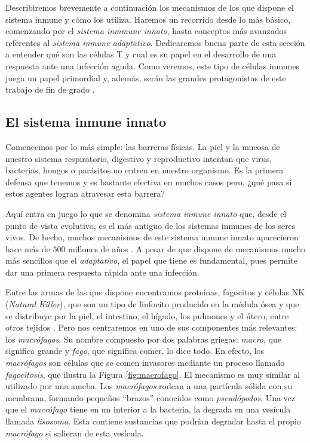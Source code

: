Describiremos brevemente a continuación los mecanismos de los que dispone el sistema inmune y cómo los utiliza. Haremos un recorrido desde lo más básico, comenzando por el \textit{sistema inmmune innato}, hasta conceptos más avanzados referentes al \textit{sistema inmune adaptativo}. Dedicaremos buena parte de esta sección a entender qué son las células T y cual es su papel en el desarrollo de una respuesta ante una infección aguda. Como veremos, este tipo de células inmunes juega un papel primordial y, además, serán las grandes protagonistas de este trabajo de fin de grado \citep{JTB}.  

\subsection{El sistema inmune innato}
\label{sub:sistInmInnato}

Comencemos por lo más simple: las barreras físicas. La piel y la mucosa de nuestro sistema respiratorio, digestivo y reproductivo intentan que virus, bacterias, hongos o parásitos no entren en nuestro organismo. Es la primera defensa que tenemos y es bastante efectiva en muchos casos pero, ¿qué pasa si estos agentes logran atravesar esta barrera?

Aquí entra en juego lo que se denomina \textit{sistema inmune innato} que, desde el punto de vista evolutivo, es el más antiguo de los sistemas inmunes de los seres vivos. De hecho, muchos mecanismos de este sistema inmune innato aparecieron hace más de $500$ millones de años \citep{theHowItWorks}. A pesar de que dispone de mecanismos mucho más sencillos que el \textit{adaptativo}, el papel que tiene es fundamental, pues permite dar una primera respuesta rápida ante una infección. 

Entre las armas de las que dispone encontramos proteínas, fagocitos y células NK (\textit{Natural Killer}), que son un tipo de linfocito producido en la médula ósea y que se distribuye por la piel, el intestino, el hígado, los pulmones y el útero, entre otros tejidos \citep{celulasNK}. Pero nos centraremos en uno de sus componentes más relevantes: los \textit{macrófagos}. Su nombre compuesto por dos palabras griegas: \textit{macro}, que significa grande y \textit{fago}, que significa comer, lo dice todo. En efecto, los \textit{macrófagos} son células que se comen invasores mediante un proceso llamado \textit{fagocitosis}, que ilustra la Figura \ref{fig:macrofago}. El mecanismo es muy similar al utilizado por una ameba. Los \textit{macrófagos} rodean a una partícula sólida con su membrana, formando pequeños ``brazos'' conocidos como \textit{pseudópodos}. Una vez que el \textit{macrófago} tiene en un interior a la bacteria, la degrada en una vesícula llamada \textit{lisosoma}. Esta contiene sustancias que podrían degradar hasta el propio \textit{macrófago} si salieran de esta vesícula. 


